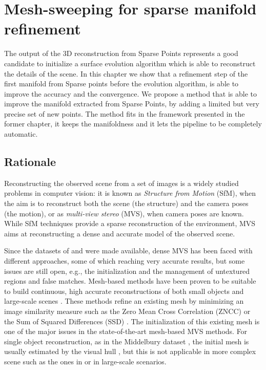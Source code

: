\chapter{Mesh-sweeping for sparse manifold refinement}

The output of the 3D reconstruction from Sparse Points represents a good candidate to initialize a surface evolution algorithm which is able to reconstruct the details of the scene. 
In this chapter we show that a refinement step of the first manifold from Sparse points before the evolution algorithm, is able to improve the accuracy and the convergence. 
We propose a method that is able to improve the manifold extracted from Sparse Points, by adding a limited but very precise set of new points. 
The method fits in the framework presented in the former chapter, it keeps the manifoldness and it lets the pipeline to be completely automatic.


\minitoc

\section{Rationale}

Reconstructing the observed scene from a set of images is a widely studied problems in computer vision: it is known as \emph{Structure from Motion} (SfM), when the aim is to reconstruct both the scene (the structure) and the camera poses (the motion), or as \emph{multi-view stereo} (MVS), when camera poses are known.
While SfM techniques provide a sparse reconstruction of the environment, MVS aims at reconstructing a dense and accurate model of the observed scene. 

Since the datasets of \cite{seitz_et_al06} and \cite{strecha2008} were made available, dense MVS has been faced with different approaches, some of which reaching very accurate results, but some issues are still open, e.g., the initialization and the management of untextured regions and false matches.
Mesh-based methods have been proven to be suitable to build continuous, high accurate reconstructions of both small objects and large-scale scenes \cite{hiep2009towards,vu_et_al_2012,salman2010surface}.
These methods refine an existing mesh by minimizing an image similarity measure such as the Zero Mean Cross Correlation (ZNCC) \cite{hiep2009towards,pons2007multi,zaharescu2007transformesh} or the Sum of Squared Differences (SSD) \cite{delaunoy_et_al_08,delaunoy2011gradient}. 
The initialization of this existing mesh is one of the major issues in the state-of-the-art mesh-based MVS methods. For single object reconstruction, as in the Middelbury dataset \cite{seitz_et_al06}, the initial mesh is usually estimated by the visual hull \cite{laurentini1994visual}, but this is not applicable in more complex scene such as the ones in \cite{strecha2008} or in large-scale scenarios.

